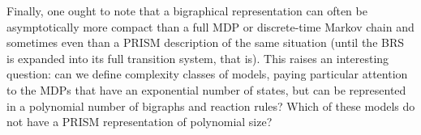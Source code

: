 \documentclass[runningheads]{llncs}
\begin{document}
Finally, one ought to note that a bigraphical representation can often be
asymptotically more compact than a full MDP or discrete-time Markov chain and
sometimes even than a PRISM description of the same situation (until the BRS is
expanded into its full transition system, that is). This raises an interesting
question: can we define complexity classes of models, paying particular
attention to the MDPs that have an exponential number of states, but can be
represented in a polynomial number of bigraphs and reaction rules? Which of
these models do not have a PRISM representation of polynomial size?



\end{document}
